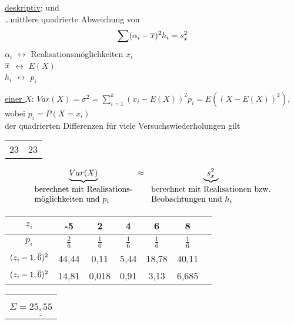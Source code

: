 \underline{deskriptiv}:  und  \\
 \dots mittlere quadrierte Abweichung von 
	$$ \sum (\alpha_i - \overline{x})^2 h_i = s_x^2$$
$\alpha_i$ $\leftrightarrow$ Realisationsmöglichkeiten $x_i$ \\
$\overline{x}$ $\leftrightarrow$ $E(X)$	\\
$h_i$ $\leftrightarrow$ $p_i$

\underline{ einer  $X$}: 
	$Var(X) = \sigma^2 = \sum_{i=1}^{k}(x_i - E(X))^2 p_i		
		= E((X-E(X))^2)$, wobei $p_i = P(X=x_i)$\\
 der quadrierten Differenzen für viele Versuchswiederholungen gilt  

\begin{tabular}{p{0.5\linewidth} p{0.5\linewidth}}
\hfill 23 & 23 \hfill\\
\end{tabular}

\def\varA{\mbox{
	\begin{tabular}{@{}l@{}}
		berechnet mit Realisations-\\möglichkeiten und $p_i$
	\end{tabular}
	}
	\hspace{0em}
}
\def\varB{\mbox{
	\begin{tabular}{@{}l@{}}
		berechnet mit Realisationen bzw.\\ Beobachtungen und $h_i$
	\end{tabular}
	}
	\hspace{0em}
}

	$$ \underbrace{Var(X)}_{\varA} \approx \; \underbrace{s_x^2}_{\varB}$$

\begin{tabular}{c | c | c | c | c | c l }
$z_i$	  & -5 & 2 & 4 & 6 & 8\\
\hline
$p_i$  &  $\frac{2}{6}$  & $\frac{1}{6}$ & $\frac{1}{6}$ & $\frac{1}{6}$ & $\frac{1}{6}$ \\
$(z_i -1,\overline{6})^2$ & 44,44 & 0,11 & 5,44 & 18,78 & 40,11 \\
$(z_i -1,\overline{6})^2$ & 14,81 & 0,018 & 0,91 & 3,13 & 6,685 \\
\end{tabular}
\begin{tabular}{l}
\\ \\ \\
$\Sigma = \underline{\underline{25,55}}$	
\end{tabular}

